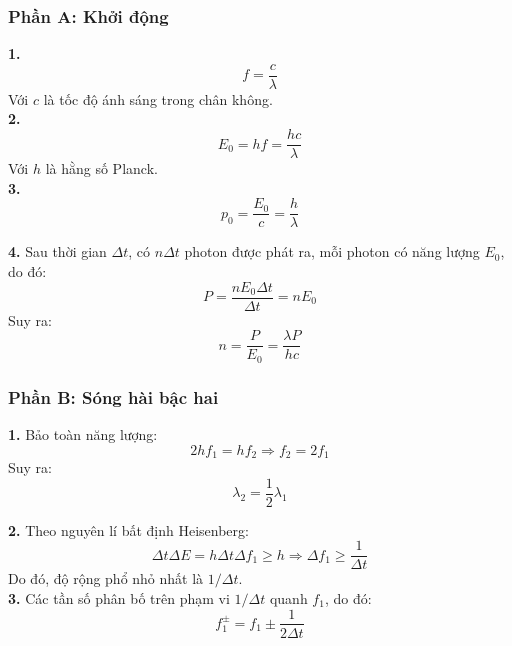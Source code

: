 \subsubsection*{Phần A: Khởi động}
\noindent \textbf{1.}
\begin{equation*}
  f = \frac{c}{\lambda}
\end{equation*}
Với $c$ là tốc độ ánh sáng trong chân không.\\

\noindent\textbf{2.}
\begin{equation*}
  E_0 = h f = \frac{hc}{\lambda}
\end{equation*}
Với $h$ là hằng số Planck.\\

\noindent\textbf{3.}
\begin{equation*}
  p_0 = \frac{E_0}{c} = \frac{h}{\lambda}
\end{equation*}

\textbf{4.} Sau thời gian $\Delta t$, có $n \Delta t$ photon được phát ra, mỗi photon có năng lượng $E_0$, do đó:
\begin{equation*}
  P = \frac{n E_0 \Delta t}{\Delta t} = n E_0
\end{equation*}
Suy ra:
\begin{equation*}
  n = \frac{P}{E_0} = \frac{\lambda P}{hc}
\end{equation*}

\subsubsection*{Phần B: Sóng hài bậc hai}
\noindent\textbf{1.} Bảo toàn năng lượng:
\begin{equation*}
  2 h f_1 = h f_2 \Rightarrow f_2 = 2 f_1
\end{equation*}
Suy ra:
\begin{equation*}
  \lambda_2 = \frac{1}{2} \lambda_1
\end{equation*}

\noindent\textbf{2.} Theo nguyên lí bất định Heisenberg:
\begin{equation*}
  \Delta t \Delta E = h \Delta t \Delta f_1 \geq h \Rightarrow \Delta f_1 \geq \frac{1}{\Delta t}
\end{equation*}
Do đó, độ rộng phổ nhỏ nhất là $1/\Delta t$.\\

\noindent\textbf{3.} Các tần số phân bố trên phạm vi $1/\Delta t$ quanh $f_1$, do đó:
\begin{equation*}
  f_1^{\pm} = f_1 \pm \frac{1}{2\Delta t}
\end{equation*}

